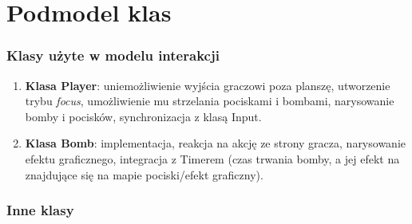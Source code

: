 \documentclass[a4paper,twoside]{article}
\begin{document}
\vspace*{2\baselineskip}

\part{\huge \textbf{Podmodel klas}}

\section{Klasy użyte w modelu interakcji}

\begin{enumerate}
	
	\item \textbf{Klasa Player}: uniemożliwienie wyjścia graczowi poza planszę, utworzenie trybu \emph{focus}, umożliwienie mu strzelania pociskami i bombami, narysowanie bomby i pocisków, synchronizacja z klasą Input.	
	
	\item \textbf{Klasa Bomb}: implementacja, reakcja na akcję ze strony gracza, narysowanie efektu graficznego, integracja z Timerem (czas trwania bomby, a jej efekt na znajdujące się na mapie pociski/efekt graficzny).
	
\end{enumerate} 

\newpage

\section{Inne klasy}
\end{document}
